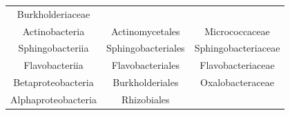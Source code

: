 \documentclass[]{article}
\begin{document}
\begin{longtable}[]{@{}ccc@{}}
\begin{minipage}[t]{0.30\columnwidth}
Burkholderiaceae\strut
\end{minipage}\tabularnewline
\begin{minipage}[t]{0.28\columnwidth}\centering\strut
Actinobacteria\strut
\end{minipage} & \begin{minipage}[t]{0.30\columnwidth}\centering\strut
Actinomycetales\strut
\end{minipage} & \begin{minipage}[t]{0.30\columnwidth}\centering\strut
Micrococcaceae\strut
\end{minipage}\tabularnewline
\begin{minipage}[t]{0.28\columnwidth}\centering\strut
Sphingobacteriia\strut
\end{minipage} & \begin{minipage}[t]{0.30\columnwidth}\centering\strut
Sphingobacteriales\strut
\end{minipage} & \begin{minipage}[t]{0.30\columnwidth}\centering\strut
Sphingobacteriaceae\strut
\end{minipage}\tabularnewline
\begin{minipage}[t]{0.28\columnwidth}\centering\strut
Flavobacteriia\strut
\end{minipage} & \begin{minipage}[t]{0.30\columnwidth}\centering\strut
Flavobacteriales\strut
\end{minipage} & \begin{minipage}[t]{0.30\columnwidth}\centering\strut
Flavobacteriaceae\strut
\end{minipage}\tabularnewline
\begin{minipage}[t]{0.28\columnwidth}\centering\strut
Betaproteobacteria\strut
\end{minipage} & \begin{minipage}[t]{0.30\columnwidth}\centering\strut
Burkholderiales\strut
\end{minipage} & \begin{minipage}[t]{0.30\columnwidth}\centering\strut
Oxalobacteraceae\strut
\end{minipage}\tabularnewline
\begin{minipage}[t]{0.28\columnwidth}\centering\strut
Alphaproteobacteria\strut
\end{minipage} & \begin{minipage}[t]{0.30\columnwidth}\centering\strut
Rhizobiales\strut
\end{minipage} & \begin{minipage}[t]{0.30\columnwidth}\centering\strut

\end{minipage}
\end{longtable}
\end{document}
